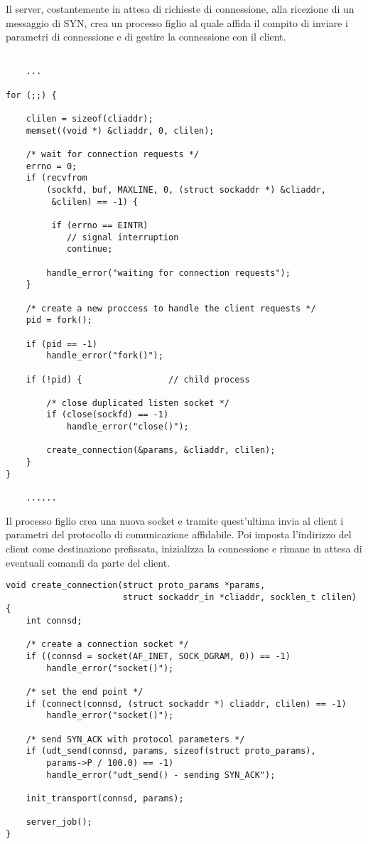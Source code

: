 Il server, costantemente in attesa di richieste di connessione, alla ricezione di un messaggio di SYN, crea un processo figlio al quale affida il compito di inviare i parametri di connessione e di gestire la connessione con il client.

\begin{lstlisting}[title=server:instaurazione della connessione]

	...

for (;;) {

	clilen = sizeof(cliaddr);
	memset((void *) &cliaddr, 0, clilen);

	/* wait for connection requests */
	errno = 0;
	if (recvfrom
		(sockfd, buf, MAXLINE, 0, (struct sockaddr *) &cliaddr,
		 &clilen) == -1) {

		 if (errno == EINTR)
			// signal interruption
			continue;

		handle_error("waiting for connection requests");
	}

	/* create a new proccess to handle the client requests */
	pid = fork();

	if (pid == -1)
		handle_error("fork()");

	if (!pid) {                 // child process

		/* close duplicated listen socket */
		if (close(sockfd) == -1)
			handle_error("close()");

		create_connection(&params, &cliaddr, clilen);
	}
}

	......

\end{lstlisting}


Il processo figlio crea una nuova socket e tramite quest'ultima invia al client i parametri del protocollo di comunicazione affidabile.
Poi imposta l'indirizzo del client come destinazione prefissata, inizializza la connessione e rimane in attesa di eventuali comandi da parte del client.

\begin{lstlisting}[title=connessione del nuovo processo]
void create_connection(struct proto_params *params,
					   struct sockaddr_in *cliaddr, socklen_t clilen)
{
	int connsd;

	/* create a connection socket */
	if ((connsd = socket(AF_INET, SOCK_DGRAM, 0)) == -1)
		handle_error("socket()");

	/* set the end point */
	if (connect(connsd, (struct sockaddr *) cliaddr, clilen) == -1)
		handle_error("socket()");

	/* send SYN_ACK with protocol parameters */
	if (udt_send(connsd, params, sizeof(struct proto_params), 
		params->P / 100.0) == -1)
		handle_error("udt_send() - sending SYN_ACK");

	init_transport(connsd, params);

	server_job();
}
\end{lstlisting}



